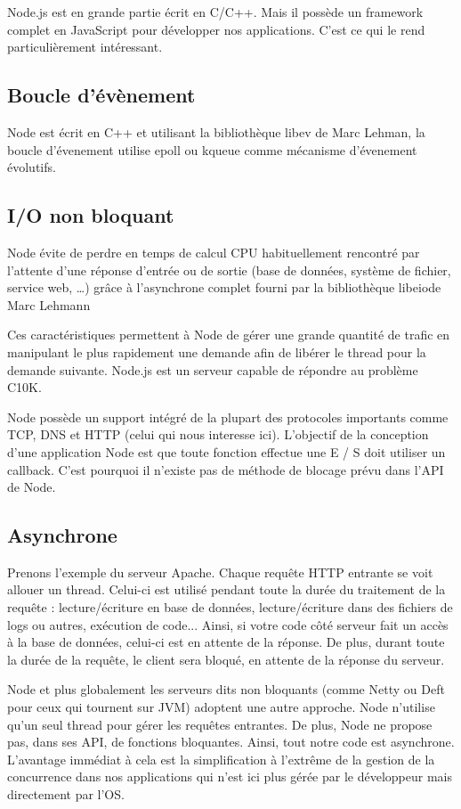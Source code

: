 Node.js est en grande partie écrit en C/C++.
Mais il possède un framework complet en JavaScript pour développer nos applications. C'est ce qui le rend particulièrement intéressant.

\subsection{Boucle d’évènement}

Node est écrit en C++ et utilisant la bibliothèque libev de Marc Lehman, la boucle d’évenement utilise epoll ou kqueue comme mécanisme d’évenement évolutifs.

\subsection{I/O non bloquant}

Node évite de perdre en temps de calcul CPU habituellement rencontré par l’attente d’une réponse d’entrée ou de sortie (base de données, système de fichier, service web, …) grâce à l’asynchrone complet fourni par la bibliothèque libeiode Marc Lehmann 

Ces caractéristiques  permettent à Node de gérer une grande quantité de trafic en manipulant le plus rapidement une demande afin de libérer le thread pour la demande suivante. Node.js est un serveur capable de répondre au problème C10K.

Node possède un support intégré de la plupart des protocoles importants comme TCP, DNS et HTTP (celui qui nous interesse ici). L’objectif de la conception d’une application Node est que toute fonction effectue une E / S doit utiliser un callback. C’est pourquoi il n’existe pas de méthode de blocage prévu dans l’API de Node.

\subsection{Asynchrone}

Prenons l'exemple du serveur Apache. Chaque requête HTTP entrante se voit allouer un thread. Celui-ci est utilisé pendant toute la durée du traitement de la requête : lecture/écriture en base de données, lecture/écriture dans des fichiers de logs ou autres, exécution de code... Ainsi, si votre code côté serveur fait un accès à la base de données, celui-ci est en attente de la réponse. De plus, durant toute la durée de la requête, le client sera bloqué, en attente de la réponse du serveur.

Node et plus globalement les serveurs dits non bloquants (comme Netty ou Deft pour ceux qui tournent sur JVM) adoptent une autre approche. Node n'utilise qu'un seul thread pour gérer les requêtes entrantes. De plus, Node ne propose pas, dans ses API, de fonctions bloquantes. Ainsi, tout notre code est asynchrone. L'avantage immédiat à cela est la simplification à l'extrême de la gestion de la concurrence dans nos applications qui n'est ici plus gérée par le développeur mais directement par l'OS.


